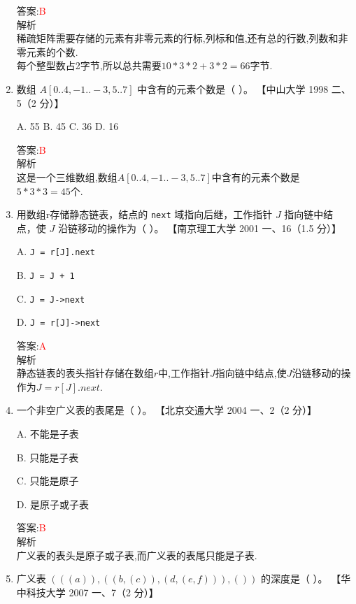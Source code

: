 \documentclass[lang=cn,newtx,10pt,scheme=chinese]{../elegantbook}
\begin{document}
\begin{enumerate}
    答案:\textcolor{red}{B}\\
    解析\\
    稀疏矩阵需要存储的元素有非零元素的行标,列标和值,还有总的行数,列数和非零元素的个数.\\
    每个整型数占2字节,所以总共需要$10*3*2+3*2=66$字节.\\
    


    \item 数组 $A[0..4, -1..-3, 5..7]$ 中含有的元素个数是（ ）。  
    【中山大学 1998 二、5（2 分）】  

    A. 55 \quad B. 45 \quad C. 36 \quad D. 16  

    答案:\textcolor{red}{B}\\
    解析\\
    这是一个三维数组,数组$A[0..4, -1..-3, 5..7]$中含有的元素个数是$5*3*3=45$个.\\

    \item 用数组r存储静态链表，结点的 \texttt{next} 域指向后继，工作指针 $J$ 指向链中结点，使 $J$ 沿链移动的操作为（ ）。  
    【南京理工大学 2001 一、16（1.5 分）】  

    A. \texttt{J = r[J].next}  

    B. \texttt{J = J + 1}  

    C. \texttt{J = J->next}  

    D. \texttt{J = r[J]->next}  

    答案:\textcolor{red}{A}\\
    解析\\
    静态链表的表头指针存储在数组$r$中,工作指针$J$指向链中结点,使$J$沿链移动的操作为$J = r[J].next$.\\

    \item 一个非空广义表的表尾是（ ）。  
    【北京交通大学 2004 一、2（2 分）】  

    A. 不能是子表  

    B. 只能是子表  

    C. 只能是原子  

    D. 是原子或子表  

    答案:\textcolor{red}{B}\\
    解析\\
    广义表的表头是原子或子表,而广义表的表尾只能是子表.\\



    \item 广义表 $(((a)), ((b, (c)), (d, (e, f))), ())$ 的深度是（ ）。  
    【华中科技大学 2007 一、7（2 分）】  


\end{enumerate}
\end{document}
